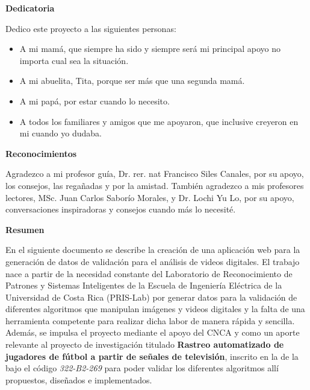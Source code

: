 \begin{center}\huge{\textbf{Dedicatoria}}\end{center}

Dedico este proyecto a las siguientes personas:
\begin{itemize} 
	\item A mi mamá, que siempre ha sido y siempre será mi principal apoyo no importa cual sea la situación.
	\item A mi abuelita, Tita, porque ser más que una segunda mamá.
	\item A mi papá, por estar cuando lo necesito.
	\item A todos los familiares y amigos que me apoyaron, que inclusive creyeron en mi cuando yo dudaba.  
\end{itemize}

\cleardoublepage

\begin{center}\huge{\textbf{Reconocimientos}}\end{center}

Agradezco a mi profesor guía,  Dr. rer. nat Francisco Siles Canales, por su apoyo, los consejos, las regañadas y por la amistad. También agradezco a mis profesores lectores, MSc. Juan Carlos Saborío Morales, y Dr. Lochi Yu Lo, por su apoyo, conversaciones inspiradoras y consejos cuando más lo necesité.

\cleardoublepage

\begin{center}\huge{\textbf{Resumen}}\end{center}


En el siguiente documento se describe la creación de una aplicación web para la generación de datos de validación para el análisis de videos digitales. El trabajo nace a partir de la necesidad constante del Laboratorio de Reconocimiento de Patrones y Sistemas Inteligentes de la Escuela de Ingeniería Eléctrica de la Universidad de Costa Rica (PRIS-Lab) por generar datos para la validación de diferentes algoritmos que manipulan imágenes y videos digitales y la falta de una herramienta competente para realizar dicha labor de manera rápida y sencilla. Además, se impulsa el proyecto mediante el apoyo del CNCA y como un aporte relevante al proyecto de investigación titulado \textbf{Rastreo automatizado de jugadores de fútbol a partir de señales de televisión}, inscrito en la \vinv de la \ucr bajo el código \textit{322-B2-269} para poder validar los diferentes algoritmos allí propuestos, diseñados e implementados.\\


